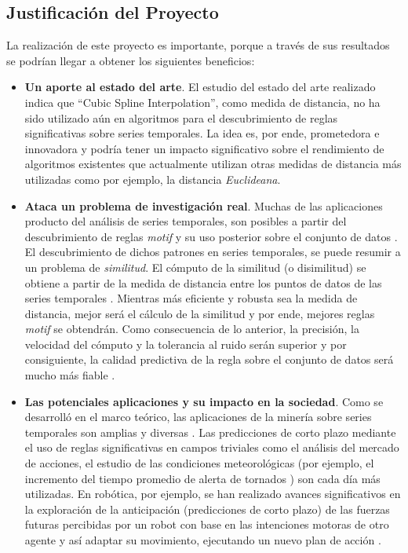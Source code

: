 \subsection{Justificaci\'on del Proyecto}
La realizaci\'on de este proyecto es importante, porque a trav\'es de sus resultados se podr\'ian llegar a obtener los siguientes beneficios:
\begin{itemize}
\item {\textbf{\textbf{Un aporte al estado del arte}}. El estudio del estado del arte realizado indica que \enquote{Cubic Spline Interpolation}, como medida de distancia, no ha sido utilizado a\'un en algoritmos para el descubrimiento de reglas significativas sobre series temporales. La idea es, por ende, prometedora e innovadora y podr\'ia tener un impacto significativo sobre el rendimiento de algoritmos existentes que actualmente utilizan otras medidas de distancia m\'as utilizadas como por ejemplo, la distancia \textit{Euclideana}.}
\item {\textbf{Ataca un problema de investigaci\'on real}. Muchas de las aplicaciones producto del an\'alisis de series temporales, son posibles a partir del descubrimiento de reglas \textit{motif} y su uso posterior sobre el conjunto de datos \cite{main}. El descubrimiento de dichos patrones en series temporales, se puede resumir a un problema de \textit{similitud}. El c\'omputo de la similitud (o disimilitud) se obtiene a partir de la medida de distancia entre los puntos de datos de las series temporales \cite{main}. Mientras m\'as eficiente y robusta sea la medida de distancia, mejor ser\'a el c\'alculo de la similitud y por ende, mejores reglas \textit{motif} se obtendr\'an. Como consecuencia de lo anterior, la precisi\'on, la velocidad del c\'omputo y la tolerancia al ruido ser\'an superior y por consiguiente, la calidad predictiva de la regla sobre el conjunto de datos ser\'a mucho m\'as fiable \cite{measurements}.}
\item {\textbf{Las potenciales aplicaciones y su impacto en la sociedad}. Como se desarroll\'o en el marco te\'orico, las aplicaciones de la miner\'ia sobre series temporales son amplias y diversas  \cite{main}. Las predicciones de corto plazo mediante el uso de reglas significativas en campos triviales como el an\'alisis del mercado de accio\-nes, el estudio de las condiciones meteorol\'ogicas (por ejemplo, el incremento del tiempo promedio de alerta de tornados \cite{weatherforcasting}) son cada d\'ia m\'as utilizadas. En rob\'otica, por ejemplo, se han realizado avances significativos en la exploraci\'on de la anticipaci\'on (predicciones de corto plazo) de las fuerzas futuras percibidas por un robot con base en las intenciones motoras de otro agente y as\'i adaptar su movimiento, ejecutando un nuevo plan de acci\'on \cite{robotics}.}
\end{itemize}